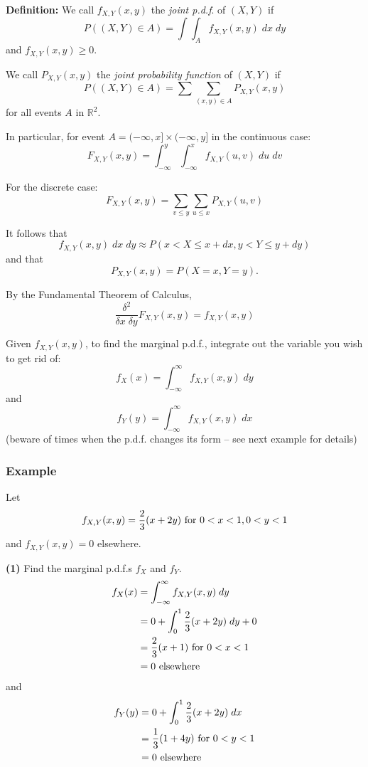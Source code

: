 \documentclass[12pt]{article}
\begin{document}
\textbf{Definition:} We call $f_{X,Y} (x,y)$ the \emph{joint p.d.f}. of $(X,Y)$ if 
\[
    P((X,Y) \in A) = \int \int_{A} f_{X,Y} (x,y) \; dx \; dy
\]
and $f_{X,Y} (x,y) \geq 0$.

We call $P_{X,Y} (x,y)$ the \emph{joint probability function} of $(X,Y)$ if
\[
    P((X,Y) \in A) = \sum \sum_{(x,y) \in A} P_{X,Y} (x,y)
\]
for all events $A$ in $\mathds{R}^2$.

In particular, for event $A = (-\infty, x] \times (-\infty, y]$ in the continuous case: %
\[
    F_{X,Y} (x,y) = \int_{-\infty}^y \int_{-\infty}^x f_{X,Y} (u,v) \; du \; dv
\]

For the discrete case:
\[
    F_{X,Y} (x,y) = \sum_{v \leq y} \sum_{u \leq x} P_{X,Y} (u,v)
\]

It follows that
\[
    f_{X,Y} (x,y) \; dx \; dy \approx P(x < X \leq x + dx, y < Y \leq y + dy)
\]
and that
\[
    P_{X,Y} (x,y) = P(X = x, Y = y).
\]

By the Fundamental Theorem of Calculus,
\[
    \frac{\delta^2}{\delta x \; \delta y} F_{X,Y} (x,y) = f_{X,Y} (x,y)
\]

Given $f_{X,Y} (x,y)$, to find the marginal p.d.f., integrate out the variable you wish to get rid of:
\[
    f_X (x) = \int_{-\infty}^{\infty} f_{X,Y} (x,y) \; dy
\]
and
\[
    f_Y (y) = \int_{-\infty}^{\infty} f_{X,Y} (x,y) \; dx
\]
(beware of times when the p.d.f. changes its form -- see next example for details)

\subsubsection{Example}
Let
\[
    f_{X,Y} (x,y) = \frac{2}{3} (x + 2y) \textnormal{ for } 0 < x < 1, 0 < y < 1
\]
and $f_{X,Y} (x,y) = 0$ elsewhere.

\textbf{(1)} Find the marginal p.d.f.s $f_X$ and $f_Y$.
\begin{align*}
    f_X (x) &= \int_{-\infty}^{\infty} f_{X,Y} (x,y) \; dy \\
        &= 0 + \int_0^1 \frac{2}{3} (x + 2y) \; dy + 0 \\
        &= \frac{2}{3} (x+1) \textnormal{ for } 0 < x < 1 \\
        &= 0 \textnormal{ elsewhere}
\end{align*}
and
\begin{align*}
    f_Y (y) &= 0 + \int_0^1 \frac{2}{3} (x + 2y) \; dx \\
        &= \frac{1}{3} (1 + 4y) \textnormal{ for } 0 < y < 1 \\
        &= 0 \textnormal{ elsewhere}
\end{align*}
\end{document}
